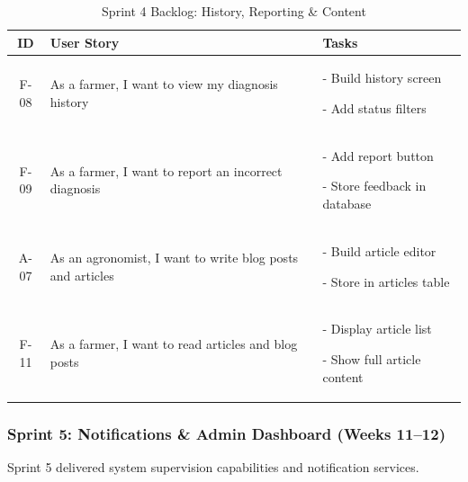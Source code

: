 \documentclass[12pt]{article}
\begin{document}
\begin{table}[H]
\centering
\caption{Sprint 4 Backlog: History, Reporting \& Content}
\label{tab:sprint4}
\begin{tabular}{|c|p{8cm}|p{8cm}|}
\hline
\textbf{ID} & \textbf{User Story} & \textbf{Tasks} \\
\hline
F-08 & As a farmer, I want to view my diagnosis history & - Build history screen \par - Add status filters \\
\hline
F-09 & As a farmer, I want to report an incorrect diagnosis & - Add report button \par - Store feedback in database \\
\hline
A-07 & As an agronomist, I want to write blog posts and articles & - Build article editor \par - Store in articles table \\
\hline
F-11 & As a farmer, I want to read articles and blog posts & - Display article list \par - Show full article content \\
\hline
\end{tabular}
\end{table}

\subsubsection*{Sprint 5: Notifications \& Admin Dashboard (Weeks 11--12)}
Sprint 5 delivered system supervision capabilities and notification services.
\end{document}
